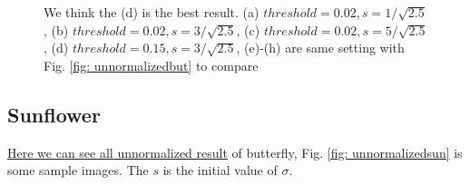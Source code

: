 \documentclass[final]{cvpr}
\begin{document}
\begin{appendices}
\begin{figure}[htbp]
{    }
    \quad
    \caption{We think the (d) is the best result. (a) $threshold=0.02, s=1/\sqrt{2.5}$, (b) $threshold=0.02, s=3/\sqrt{2.5}$, (c) $threshold=0.02, s=5/\sqrt{2.5}$, (d) $threshold=0.15, s=3/\sqrt{2.5}$, (e)-(h) are same setting with Fig. \ref{fig: unnormalizedbut} to compare}
    \label{fig: normalizedbut}
    \end{figure}
\subsection{Sunflower}
\href{https://github.com/Arctic-Xiangjian/assignment2/tree/main/unnormalized2}{Here we can see all unnormalized result} of butterfly, Fig. \ref{fig: unnormalizedsun} is some sample images. The $s$ is the initial value of $\sigma$.
\begin{figure}[htbp]
  \centering
  \quad
  \quad
  \quad

\end{figure}
\end{appendices}
\end{document}
